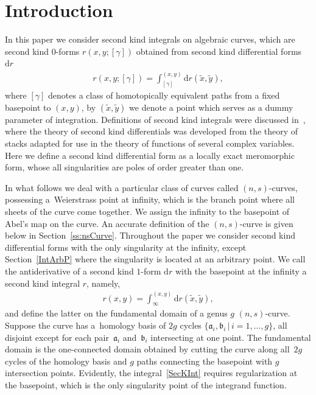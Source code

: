 \documentclass[pdftex]{sigma}
\numberwithin{equation}{section}
\newcommand{\rmd}{\mathrm{d}}
\begin{document}


\section{Introduction}

In this paper we consider second kind integrals on algebraic curves, which are second kind $0$-forms $r(x,y;[\gamma])$ obtained from second kind differential forms $\rmd r$
\begin{gather}\label{SecKIntA}
 r(x,y;[\gamma]) = \int_{[\gamma]}^{(x,y)} \rmd r(\tilde{x},\tilde{y}),
\end{gather}
where $[\gamma]$ denotes a class of homotopically equivalent paths {from a fixed basepoint to $(x,y)$, by $(\tilde{x},\tilde{y})$ we denote a point which serves as a dummy parameter of integration}. Definitions of second kind integrals were discussed in~\cite{Hodge}, where the theory of second kind differentials was developed from the theory of stacks adapted for use in the theory of functions of several complex variables. Here we define a second kind differential form as a locally exact meromorphic form, whose all singularities are poles of order greater than one.

In what follows we deal with a particular class of curves called $(n,s)$-curves, possessing a~Weierstrass point at infinity, which is the branch point where all sheets of the curve come together. We assign the infinity to the basepoint of Abel's map on the curve. An accurate definition of the $(n,s)$-curve is given below in Section~\ref{ss:nsCurve}. Throughout the paper we consider second kind differential forms with the only singularity at the infinity, except Section~\ref{IntArbP} where the singularity is located at an arbitrary point. We call the antiderivative of a second kind $1$-form $\rmd r$ with the basepoint at the infinity a second kind integral $r$, namely,
\begin{gather}\label{SecKInt}
 r(x,y) = \int_{\infty}^{(x,y)} \rmd r(\tilde{x},\tilde{y}),
\end{gather}
and define the latter on the fundamental domain of a genus $g$ $(n,s)$-curve. Suppose the curve has a~homology basis of $2g$ cycles $\{\mathfrak{a}_i, \mathfrak{b}_i \,|\, i=1,\dots,g\}$, all disjoint except for each pair~$\mathfrak{a}_i$ and~$\mathfrak{b}_i$ intersecting at one point. The fundamental domain is the one-connected domain obtained by cutting the curve along all~$2g$ cycles of the homology basis and $g$ paths connecting the basepoint with $g$ intersection points. Evidently, the integral~\eqref{SecKInt} requires regularization at the basepoint, which is the only singularity point of the integrand function.
\end{document}
